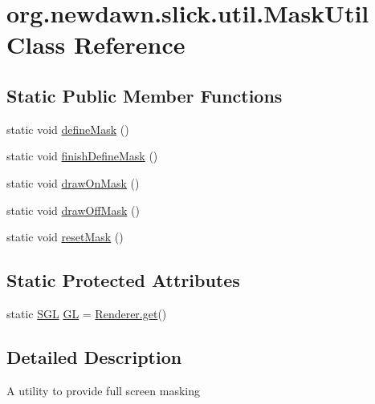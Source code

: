 \hypertarget{classorg_1_1newdawn_1_1slick_1_1util_1_1_mask_util}{}\section{org.\+newdawn.\+slick.\+util.\+Mask\+Util Class Reference}
\label{classorg_1_1newdawn_1_1slick_1_1util_1_1_mask_util}
\subsection*{Static Public Member Functions}
\begin{DoxyCompactItemize}
\item 
static void \mbox{\hyperlink{classorg_1_1newdawn_1_1slick_1_1util_1_1_mask_util_a8033731490b12eacce6a79d8e856c13a}{define\+Mask}} ()
\item 
static void \mbox{\hyperlink{classorg_1_1newdawn_1_1slick_1_1util_1_1_mask_util_a96a931dbb0d5d98dbfb107da8bd4dc79}{finish\+Define\+Mask}} ()
\item 
static void \mbox{\hyperlink{classorg_1_1newdawn_1_1slick_1_1util_1_1_mask_util_a6653026353cf1f1726a47229baa0a3f4}{draw\+On\+Mask}} ()
\item 
static void \mbox{\hyperlink{classorg_1_1newdawn_1_1slick_1_1util_1_1_mask_util_acf09fe93160deff60fe300a6f4b9721f}{draw\+Off\+Mask}} ()
\item 
static void \mbox{\hyperlink{classorg_1_1newdawn_1_1slick_1_1util_1_1_mask_util_a8d7e56e8716eefd2d771f079c084bf22}{reset\+Mask}} ()
\end{DoxyCompactItemize}
\subsection*{Static Protected Attributes}
\begin{DoxyCompactItemize}
\item 
static \mbox{\hyperlink{interfaceorg_1_1newdawn_1_1slick_1_1opengl_1_1renderer_1_1_s_g_l}{S\+GL}} \mbox{\hyperlink{classorg_1_1newdawn_1_1slick_1_1util_1_1_mask_util_a0a8dc1ea7550e654529a6f92dadea889}{GL}} = \mbox{\hyperlink{classorg_1_1newdawn_1_1slick_1_1opengl_1_1renderer_1_1_renderer_abe742c3a7dfca67c6c01821d27087308}{Renderer.\+get}}()
\end{DoxyCompactItemize}


\subsection{Detailed Description}
A utility to provide full screen masking

